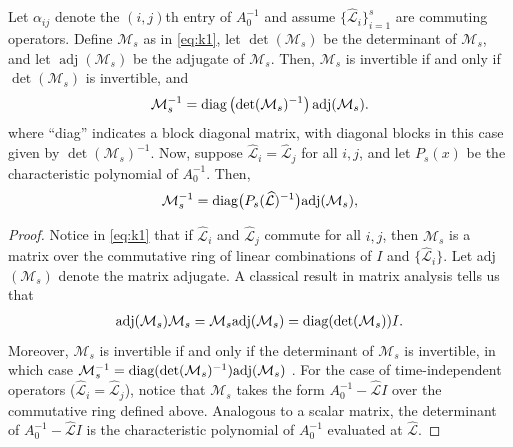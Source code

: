 \documentclass[review]{siamart}
\DeclareMathOperator{\adj}{adj}
\begin{document}
%
\begin{lemma}\label{lem:inv}
Let $\alpha_{ij}$ denote the $(i,j)$th entry of $A_0^{-1}$ and assume
$\{\widehat{\mathcal{L}}_i\}_{i=1}^s$ are commuting operators. Define $\mathcal{M}_s$
as in \eqref{eq:k1},
let $\det(\mathcal{M}_s)$ be the determinant of $\mathcal{M}_s$,
and let $\adj(\mathcal{M}_s)$ be the adjugate of $\mathcal{M}_s$. Then, $\mathcal{M}_s$
is invertible if and only if $\det(\mathcal{M}_s)$ is invertible, and
\begin{align*}
\mathcal{M}_s^{-1} = \textnormal{diag}\left(\det(\mathcal{M}_s)^{-1}\right)
	\textnormal{adj}(\mathcal{M}_s).
\end{align*}
%
where ``diag'' indicates a block diagonal matrix, with diagonal blocks in this
case given by $\det(\mathcal{M}_s)^{-1}$.
Now, suppose $\widehat{\mathcal{L}}_i = \widehat{\mathcal{L}}_j$ for
all $i,j$, and let $P_s(x)$ be the characteristic polynomial of $A_0^{-1}$. Then,
\begin{align*}
\mathcal{M}_s^{-1} = \textnormal{diag}\big(P_s(\widehat{\mathcal{L}})^{-1}\big)\textnormal{adj}(\mathcal{M}_s),
\end{align*}
\end{lemma}
\begin{proof}
Notice in \eqref{eq:k1} that if $\widehat{\mathcal{L}}_i$ and $\widehat{\mathcal{L}}_j$ commute for all $i,j$,
then $\mathcal{M}_s$ is a matrix over the commutative ring of linear combinations
of $I$ and $\{\widehat{\mathcal{L}}_i\}$. Let adj$(\mathcal{M}_s)$ denote the matrix adjugate. A
classical result in matrix analysis tells us that
%
\begin{align*}
\textnormal{adj}(\mathcal{M}_s)\mathcal{M}_s = \mathcal{M}_s\textnormal{adj}(\mathcal{M}_s)
	= \textnormal{diag}(\det(\mathcal{M}_s))I.
\end{align*}
%
Moreover, $\mathcal{M}_s$ is invertible if and only if the determinant of $\mathcal{M}_s$
is invertible, in which case $\mathcal{M}_s^{-1} = \textnormal{diag}
(\det(\mathcal{M}_s)^{-1})\textnormal{adj}(\mathcal{M}_s)$
\cite[Theorem 2.19 \& Corollary 2.21]{brown1993matrices}.
For the case of time-independent operators ($\widehat{\mathcal{L}}_i=\widehat{\mathcal{L}}_j$), notice that
$\mathcal{M}_s$ takes the form $A_0^{-1} - \widehat{\mathcal{L}}I$ over the commutative ring defined
above. Analogous to a scalar matrix, the determinant of $A_0^{-1} - \widehat{\mathcal{L}}I$ is the
characteristic polynomial of $A_0^{-1}$ evaluated at $\widehat{\mathcal{L}}$.
\end{proof}
%
\end{document}
